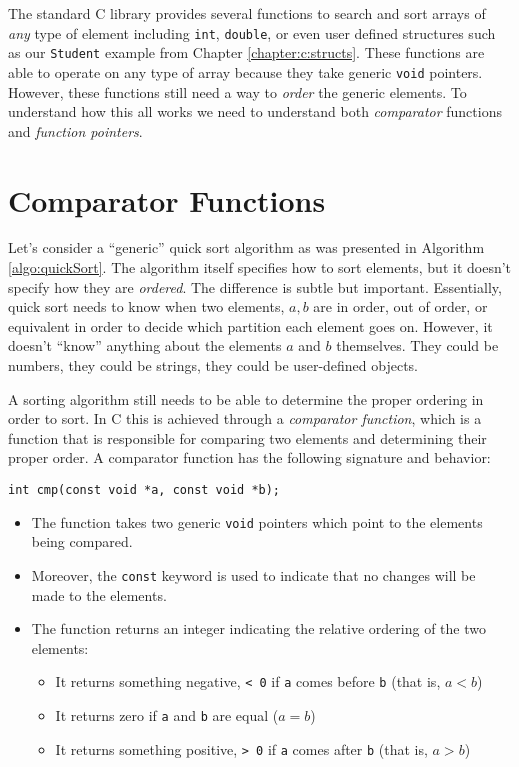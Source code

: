 

The standard C library provides several functions to search and sort
arrays of \emph{any} type of element including \texttt{int}, 
\texttt{double}, or even user defined structures such as our
\texttt{Student} example from Chapter \ref{chapter:c:structs}.  
These functions are able to operate on any type of array because they
take generic \texttt{void} pointers.  However, these functions
still need a way to \emph{order} the generic elements.  To understand
how this all works we need to understand both \emph{comparator} functions
and \emph{function pointers}.

\section{Comparator Functions}

Let's consider a ``generic'' quick sort algorithm as was presented in
Algorithm \ref{algo:quickSort}.  The algorithm itself specifies how to 
sort elements, but
it doesn't specify how they are \emph{ordered}.  The difference is subtle
but important.  Essentially, quick sort needs to know when two elements, 
$a, b$ are in order, out of order, or equivalent in order to decide which
partition each element goes on.  However, it doesn't ``know'' anything about
the elements $a$ and $b$ themselves.  They could be numbers, they could
be strings, they could be user-defined objects.  

A sorting algorithm still needs to be able to determine the proper ordering 
in order to sort.  In C this is achieved through a \emph{comparator function}, 
which is a function that is responsible for comparing two elements and
determining their proper order.  A comparator function has the following 
signature and behavior:

\texttt{int cmp(const void *a, const void *b);}

\begin{itemize}
  \item The function takes two generic \texttt{void} pointers which
  	point to the elements being compared.  
  \item Moreover, the \texttt{const} keyword is used to indicate that
  	no changes will be made to the elements.
  \item The function returns an integer indicating the relative ordering of
  	the two elements:
	\begin{itemize}
	  \item It returns something negative, \texttt{< 0} if \texttt{a}
	  comes before \texttt{b} (that is, $a < b$)
	  \item It returns zero if \texttt{a} and \texttt{b} are
	  equal ($a = b$)
	  \item It returns something positive, \texttt{> 0} if \texttt{a}
	  comes after \texttt{b} (that is, $a > b$)
	\end{itemize}
\end{itemize}

